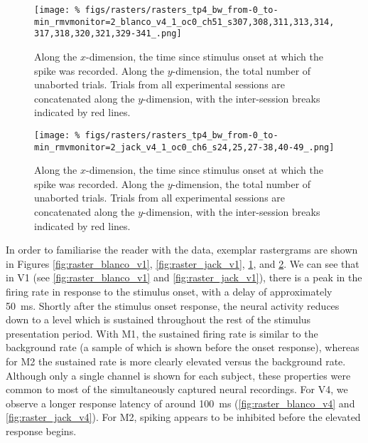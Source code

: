 \begin{figure}[p]
    \centerline{
    \texttt{[image: \%
figs/rasters/rasters\_tp4\_bw\_from-0\_to-min\_rmvmonitor=2\_blanco\_v4\_1\_oc0\_ch51\_s307,308,311,313,314,317,318,320,321,329-341\_.png]}
}
    \caption{
    Along the $x$-dimension, the time since stimulus onset at which the spike was recorded.
    Along the $y$-dimension, the total number of unaborted trials.
    Trials from all experimental sessions are concatenated along the $y$-dimension, with the inter-session breaks indicated by red lines.
}
    \label{fig:raster_blanco_v4}
\end{figure}


\begin{figure}[p]
    \centerline{
    \texttt{[image: \%
figs/rasters/rasters\_tp4\_bw\_from-0\_to-min\_rmvmonitor=2\_jack\_v4\_1\_oc0\_ch6\_s24,25,27-38,40-49\_.png]}
}
    \caption{
    Along the $x$-dimension, the time since stimulus onset at which the spike was recorded.
    Along the $y$-dimension, the total number of unaborted trials.
    Trials from all experimental sessions are concatenated along the $y$-dimension, with the inter-session breaks indicated by red lines.
}
    \label{fig:raster_jack_v4}
\end{figure}


In order to familiarise the reader with the data, exemplar rastergrams are shown in Figures \ref{fig:raster_blanco_v1}, \ref{fig:raster_jack_v1}, \ref{fig:raster_blanco_v4}, and \ref{fig:raster_jack_v4}.
We can see that in \ac{V1} (see \autoref{fig:raster_blanco_v1} and \autoref{fig:raster_jack_v1}), there is a peak in the firing rate in response to the stimulus onset, with a delay of approximately \SI{50}{\milli\second}.
Shortly after the stimulus onset response, the neural activity reduces down to a level which is sustained throughout the rest of the stimulus presentation period.
With \ac{M1}, the sustained firing rate is similar to the background rate (a sample of which is shown before the onset response), whereas for \ac{M2} the sustained rate is more clearly elevated versus the background rate.
Although only a single channel is shown for each subject, these properties were common to most of the simultaneously captured neural recordings.
For \ac{V4}, we observe a longer response latency of around \SI{100}{\milli\second} (\autoref{fig:raster_blanco_v4} and \autoref{fig:raster_jack_v4}).
For \ac{M2}, spiking appears to be inhibited before the elevated response begins.

